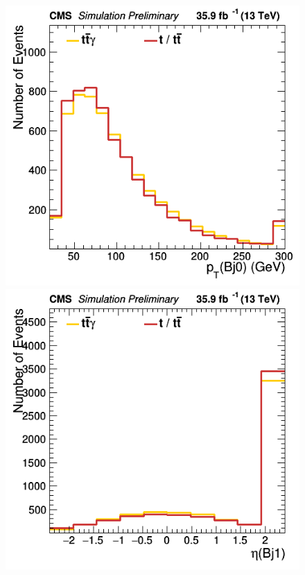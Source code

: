 \documentclass[11pt]{scrartcl}
\begin{document}
	\begin{figure}[H]
	\centering
	\begin{minipage}{.5\textwidth}
	  \centering
	  \includegraphics[width=0.75\linewidth]{figures/Notused/Bj0_pt.png}
	\end{minipage}%
	\begin{minipage}{.5\textwidth}
	  \centering
	  \includegraphics[width=0.75\linewidth]{figures/Notused/Bj1_eta.png}
	\end{minipage}
	\end{figure}
	
\end{document}
